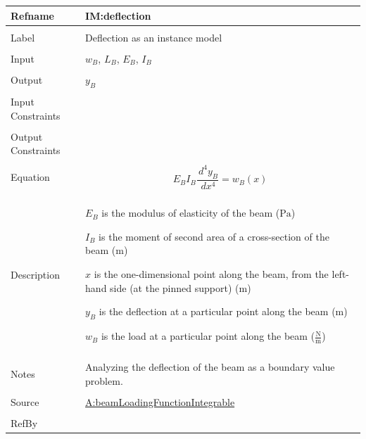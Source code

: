 \documentclass[12pt]{article}
\begin{document}
\vspace{\baselineskip}
\noindent
\begin{minipage}{\textwidth}
\begin{tabular}{>{\raggedright}p{}>{\raggedright\arraybackslash}p{}}
\toprule \textbf{Refname} & \textbf{IM:deflection}
\label{IM:deflection}
\\ \midrule \\
Label & Deflection as an instance model
        
\\ \midrule \\
Input & ${w_{B}}$, ${L_{B}}$, ${E_{B}}$, ${I_{B}}$
        
\\ \midrule \\
Output & ${y_{B}}$
         
\\ \midrule \\
Input Constraints & 
\\ \midrule \\
Output Constraints & 
\\ \midrule \\
Equation & \begin{displaymath}
           {E_{B}} {I_{B}} \frac{\,d^{4}{y_{B}}}{\,dx^{4}}={w_{B}}\left(x\right)
           \end{displaymath}
\\ \midrule \\
Description & \begin{symbDescription}
              \item{${E_{B}}$ is the modulus of elasticity of the beam (${\text{Pa}}$)}
              \item{${I_{B}}$ is the moment of second area of a cross-section of the beam (${\text{m}}$)}
              \item{$x$ is the one-dimensional point along the beam, from the left-hand side (at the pinned support) (${\text{m}}$)}
              \item{${y_{B}}$ is the deflection at a particular point along the beam (${\text{m}}$)}
              \item{${w_{B}}$ is the load at a particular point along the beam ($\frac{\text{N}}{\text{m}}$)}
              \end{symbDescription}
\\ \midrule \\
Notes & Analyzing the deflection of the beam as a boundary value problem.
        
\\ \midrule \\
Source & \hyperref[beamLoadingFunctionIntegrable]{A:beamLoadingFunctionIntegrable}
         
\\ \midrule \\
RefBy & 
\\ \bottomrule
\end{tabular}
\end{minipage}
\end{document}
